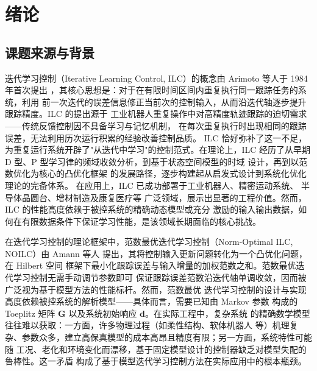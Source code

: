 \chapter{绪论}

\section{课题来源与背景}

迭代学习控制（Iterative Learning Control, ILC）的概念由 Arimoto 等人于 1984 年首次提出
，其核心思想是：对于在有限时间区间内重复执行同一跟踪任务的系统，利用
前一次迭代的误差信息修正当前次的控制输入，从而沿迭代轴逐步提升跟踪精度。ILC 的提出源于
工业机器人重复操作中对高精度轨迹跟踪的迫切需求——传统反馈控制因不具备学习与记忆机制，
在每次重复执行时出现相同的跟踪误差，无法利用历次运行积累的经验改善控制品质。
ILC 恰好弥补了这一不足，为重复运行系统开辟了"从迭代中学习"的控制范式。在理论上，ILC
经历了从早期 D 型、P 型学习律的频域收敛分析，到基于状态空间模型的时域
设计，再到以范数优化为核心的凸优化框架
的发展路径，逐步构建起从启发式设计到系统化优化理论的完备体系。
在应用上，ILC 已成功部署于工业机器人、精密运动系统、
半导体晶圆台、增材制造及康复医疗等
广泛领域，展示出显著的工程价值。然而，ILC 的性能高度依赖于被控系统的精确动态模型或充分
激励的输入输出数据，如何在有限数据条件下保证学习性能，是该领域长期面临的核心挑战。

在迭代学习控制的理论框架中，范数最优迭代学习控制（Norm-Optimal ILC, NOILC）由 Amann
等人  提出，其将控制输入更新问题转化为一个凸优化问题，在 Hilbert 空间
框架下最小化跟踪误差与输入增量的加权范数之和。范数最优迭代学习控制无需手动调节参数即可
保证跟踪误差范数沿迭代轴单调收敛，因而被广泛视为基于模型方法的性能标杆。然而，范数最优
迭代学习控制的设计与实现高度依赖被控系统的解析模型——具体而言，需要已知由 Markov 参数
构成的 Toeplitz 矩阵 $\mathbf{G}$ 以及系统初始响应 $\mathbf{d}$。在实际工程中，复杂系统
的精确数学模型往往难以获取：一方面，许多物理过程（如柔性结构、软体机器人
等）机理复杂、参数众多，建立高保真模型的成本高昂且精度有限；另一方面，系统特性可能随
工况、老化和环境变化而漂移，基于固定模型设计的控制器缺乏对模型失配的鲁棒性。这一矛盾
构成了基于模型迭代学习控制方法在实际应用中的根本瓶颈。

